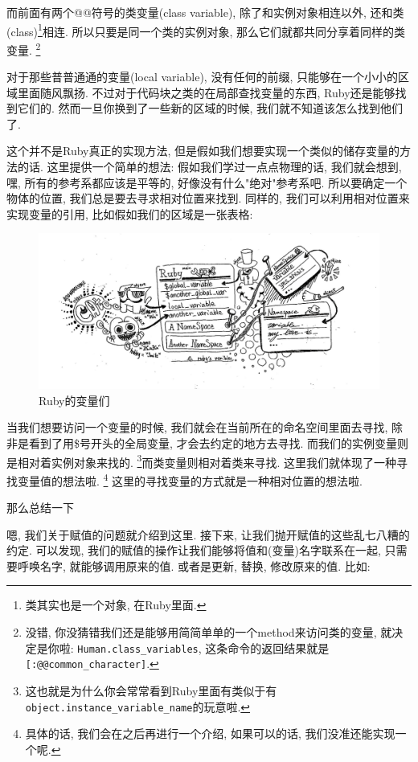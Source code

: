 而前面有两个@@符号的类变量(class variable), 除了和实例对象相连以外, 还和类(class)\footnote{类其实也是一个对象, 在Ruby里面. }相连. 所以只要是同一个类的实例对象, 那么它们就都共同分享着同样的类变量. \footnote{没错, 你没猜错我们还是能够用简简单单的一个method来访问类的变量, 就决定是你啦: \texttt{Human.class_variables}, 这条命令的返回结果就是\texttt{[:@@common_character]}. }

对于那些普普通通的变量(local variable), 没有任何的前缀, 只能够在一个小小的区域里面随风飘扬. 不过对于代码块之类的在局部查找变量的东西, Ruby还是能够找到它们的. 然而一旦你换到了一些新的区域的时候, 我们就不知道该怎么找到他们了. 

这个并不是Ruby真正的实现方法, 但是假如我们想要实现一个类似的储存变量的方法的话. 这里提供一个简单的想法: 假如我们学过一点点物理的话, 我们就会想到, 嘿, 所有的参考系都应该是平等的, 好像没有什么"绝对"参考系吧. 所以要确定一个物体的位置, 我们总是要去寻求相对位置来找到. 同样的, 我们可以利用相对位置来实现变量的引用, 比如假如我们的区域是一张表格: 

\begin{figure}[h]
  \centering
  \includegraphics[width=\textwidth]{image/chapter/1_language/ruby_variables.jpg}
  \caption{Ruby的变量们}
\end{figure}

当我们想要访问一个变量的时候, 我们就会在当前所在的命名空间里面去寻找, 除非是看到了用\$号开头的全局变量, 才会去约定的地方去寻找. 而我们的实例变量则是相对着实例对象来找的. \footnote{这也就是为什么你会常常看到Ruby里面有类似于有\texttt{object.instance_variable_name}的玩意啦. }而类变量则相对着类来寻找. 这里我们就体现了一种寻找变量值的想法啦. \footnote{具体的话, 我们会在之后再进行一个介绍, 如果可以的话, 我们没准还能实现一个呢. } 这里的寻找变量的方式就是一种相对位置的想法啦. 

那么总结一下

嗯, 我们关于赋值的问题就介绍到这里. 接下来, 让我们抛开赋值的这些乱七八糟的约定. 可以发现, 我们的赋值的操作让我们能够将值和(变量)名字联系在一起, 只需要呼唤名字, 就能够调用原来的值. 或者是更新, 替换, 修改原来的值. 比如: 

